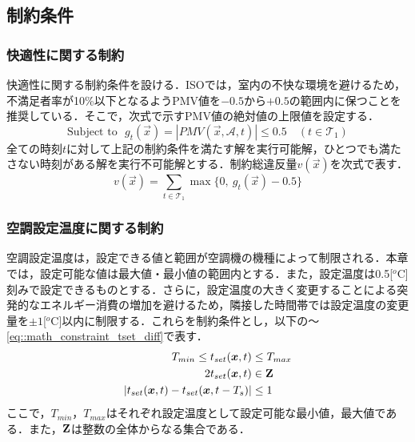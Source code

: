 \subsection{制約条件}
\subsubsection{快適性に関する制約}
快適性に関する制約条件を設ける．ISOでは，室内の不快な環境を避けるため，不満足者率が10\%以下となるようPMV値を$-0.5$から$+0.5$の範囲内に保つことを推奨している．そこで，次式で示すPMV値の絶対値の上限値を設定する．
\begin{equation}
  \mbox{Subject\ to} ~~~g_t(\vec{x})=|PMV(\vec{x},\mathcal{A}, t) |  \leq 0.5\quad(t \in \mathcal{T}_1)
  \label{eq::math_constraint_pmv}
\end{equation}
全ての時刻$t$に対して上記の制約条件を満たす解を実行可能解，ひとつでも満たさない時刻がある解を実行不可能解とする．制約総違反量$v(\vec{x})$を次式で表す．
\begin{equation}
  v(\vec{x}) = \sum_{t\in \mathcal{T}_1}  \max_{}{\{0,~g_t(\vec{x})-0.5\}}
  \label{eq::math_constraint_violation_pmv}
\end{equation}

\subsubsection{空調設定温度に関する制約}
空調設定温度は，設定できる値と範囲が空調機の機種によって制限される．本章では，設定可能な値は最大値・最小値の範囲内とする．また，設定温度は0.5[$^o$C]刻みで設定できるものとする．さらに，設定温度の大きく変更することによる突発的なエネルギー消費の増加を避けるため，隣接した時間帯では設定温度の変更量を$\pm1$[$^o$C]以内に制限する．これらを制約条件とし，以下の～\eqref{eq::math_constraint_tset_diff}で表す．
\begin{eqnarray}
  T_{min} \leq t_{set}(\vec{x},t) & \leq T_{max}
  \label{eq::math_constraint_tset_minmax} \\
  2 t_{set}(\vec{x},t) & \in \bf{Z}
  \label{eq::math_constraint_tset_int} \\
  |t_{set}(\vec{x},t) - t_{set}(\vec{x},t-T_{s})| & \leq 1
  \label{eq::math_constraint_tset_diff}
\end{eqnarray}
ここで，$T_{min}$，$T_{max}$はそれぞれ設定温度として設定可能な最小値，最大値である．また，$\bf{Z}$は整数の全体からなる集合である．

